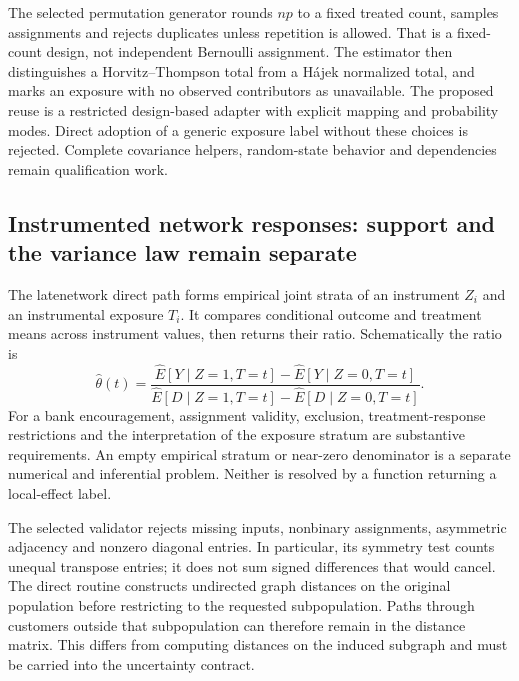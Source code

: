 The selected permutation generator rounds $np$ to a fixed treated count, samples assignments and rejects duplicates unless repetition is allowed. That is a fixed-count design, not independent Bernoulli assignment. The estimator then distinguishes a Horvitz--Thompson total from a H\'ajek normalized total, and marks an exposure with no observed contributors as unavailable. The proposed reuse is a restricted design-based adapter with explicit mapping and probability modes. Direct adoption of a generic exposure label without these choices is rejected. Complete covariance helpers, random-state behavior and dependencies remain qualification work.\citep{exec25_rnet_exposure,exec25_rnet_choice}

\subsection{Instrumented network responses: support and the variance law remain separate}

The latenetwork direct path forms empirical joint strata of an instrument $Z_i$ and an instrumental exposure $T_i$. It compares conditional outcome and treatment means across instrument values, then returns their ratio. Schematically the ratio is
\[
 \widehat\theta(t)=
 \frac{\widehat E[Y\mid Z=1,T=t]-\widehat E[Y\mid Z=0,T=t]}
      {\widehat E[D\mid Z=1,T=t]-\widehat E[D\mid Z=0,T=t]}.
\]
For a bank encouragement, assignment validity, exclusion, treatment-response restrictions and the interpretation of the exposure stratum are substantive requirements. An empty empirical stratum or near-zero denominator is a separate numerical and inferential problem. Neither is resolved by a function returning a local-effect label.\citep{exec25_rnet_late}

The selected validator rejects missing inputs, nonbinary assignments, asymmetric adjacency and nonzero diagonal entries. In particular, its symmetry test counts unequal transpose entries; it does not sum signed differences that would cancel. The direct routine constructs undirected graph distances on the original population before restricting to the requested subpopulation. Paths through customers outside that subpopulation can therefore remain in the distance matrix. This differs from computing distances on the induced subgraph and must be carried into the uncertainty contract.\citep{exec25_rnet_late}


